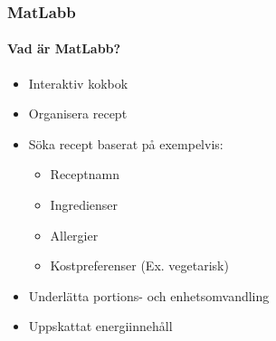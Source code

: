 %
%

\begin{frame}
  \frametitle{MatLabb}
  \framesubtitle{Vad är MatLabb?}
  \begin{itemize}
    \item<1-> Interaktiv kokbok
    \item<2-> Organisera recept
    \item<3-> Söka recept baserat på exempelvis:
      \begin{itemize}
        \item Receptnamn
        \item Ingredienser
        \item Allergier
        \item Kostpreferenser (Ex. vegetarisk)
      \end{itemize}
    \item<4-> Underlätta portions- och enhetsomvandling
    \item<5-> Uppskattat energiinnehåll
  \end{itemize}
\end{frame}
